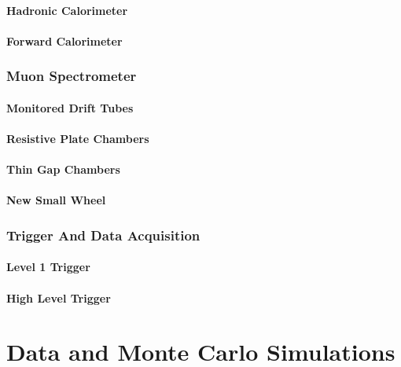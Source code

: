\documentclass{umassthesis}          %
\begin{document}
\subsubsection{Hadronic Calorimeter}\label{sec:atlas_had_calorimeter}
 
\subsubsection{Forward Calorimeter}\label{sec:atlas_fcal}


\subsection{Muon Spectrometer}\label{sec:atlas_muon}

\subsubsection{Monitored Drift Tubes}\label{sec:atlas_mdt}

\subsubsection{Resistive Plate Chambers}\label{sec:atlas_rpc}

\subsubsection{Thin Gap Chambers}\label{sec:atlas_tgc}

\subsubsection{New Small Wheel}\label{sec:atlas_nsw}


\subsection{Trigger And Data Acquisition}\label{sec:atlas_trigger}
\subsubsection{Level 1 Trigger}\label{sec:atlas_l1_trigger}

\subsubsection{High Level Trigger}\label{sec:atlas_hlt}


\chapter{Data and Monte Carlo Simulations}\label{ch:data_mc}
\end{document}
